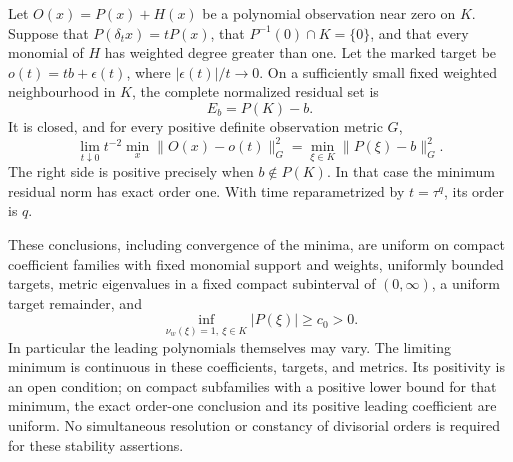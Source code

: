 \begin{theorem}\label{thm:critical-jets}
Let $O(x)=P(x)+H(x)$ be a polynomial observation near zero on $K$. Suppose that $P(\delta_t x)=tP(x)$, that $P^{-1}(0)\cap K=\{0\}$, and that every monomial of $H$ has weighted degree greater than one. Let the marked target be $o(t)=tb+\epsilon(t)$, where $|\epsilon(t)|/t\to0$. On a sufficiently small fixed weighted neighbourhood in $K$, the complete normalized residual set is
\begin{equation}\label{eq:critical-initial}
 E_b=P(K)-b.
\end{equation}
It is closed, and for every positive definite observation metric $G$,
\begin{equation}\label{eq:critical-minimum}
 \lim_{t\downarrow0}t^{-2}\min_x\|O(x)-o(t)\|_G^2
 =\min_{\xi\in K}\|P(\xi)-b\|_G^2.
\end{equation}
The right side is positive precisely when $b\notin P(K)$. In that case the minimum residual norm has exact order one. With time reparametrized by $t=\tau^q$, its order is $q$.

These conclusions, including convergence of the minima, are uniform on compact coefficient families with fixed monomial support and weights, uniformly bounded targets, metric eigenvalues in a fixed compact subinterval of $(0,\infty)$, a uniform target remainder, and
\begin{equation}\label{eq:initial-margin}
 \inf_{\nu_w(\xi)=1,\ \xi\in K}|P(\xi)|\ge c_0>0.
\end{equation}
In particular the leading polynomials themselves may vary. The limiting minimum is continuous in these coefficients, targets, and metrics. Its positivity is an open condition; on compact subfamilies with a positive lower bound for that minimum, the exact order-one conclusion and its positive leading coefficient are uniform. No simultaneous resolution or constancy of divisorial orders is required for these stability assertions.
\end{theorem}
